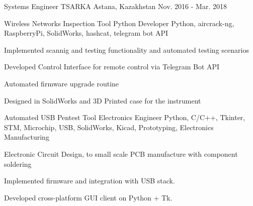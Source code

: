 \begin{cventries}
\cventry
    {Systems Engineer} %
    {TSARKA} %
    {Astana, Kazakhstan} %
    {Nov. 2016 - Mar. 2018} %
    {%
        \cvproject %
            {Wireless Networks Inspection Tool} %
            {Python Developer} %
            {Python, aircrack-ng, RaspberryPi, SolidWorks, hashcat, telegram bot API}%
            {
                \begin{cvitems}
                    \item {Implemented scannig and testing functionality and automated testing scenarios}
                    \item {Developed Control Interface for remote control via Telegram Bot API}
                    \item {Automated firmware upgrade routine}
                    \item {Designed in SolidWorks and 3D Printed case for the instrument}
                \end{cvitems}
            }
        \cvproject %
            {Automated USB Pentest Tool} %
            {Electronics Engineer} %
            {Python, C/C++, Tkinter, STM, Microchip, USB, SolidWorks, Kicad, Prototyping, Electronics Manufacturing}%
            {
                \begin{cvitems}
                    \item {Electronic Circuit Design, to small scale PCB manufacture with component
                    soldering}
                    \item {Implemented firmware and integration with USB stack.}
                    \item {Developed cross-platform GUI client on Python + Tk.}
                \end{cvitems}
            }
    }


\end{cventries}
